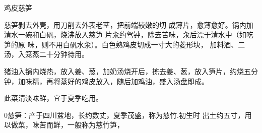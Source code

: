 \begin{recipe}{鸡皮慈笋}

\ingredients



\cooking

慈笋剥去外壳，用刀削去外表老茎，把前端较嫩的切 成薄片，愈薄愈好。锅内加清水一碗和白矾，烧沸放入慈笋 片汆约驾钟，除去苦味，汆后漂于清水中（如吃笋的原 味，则不用白矾水汆）。白色熟鸡皮切成一寸大的菱形块， 加料酒、二汤，入笼蒸二十分钟待用。

\step 猪油入锅内烧热，放入姜、葱，加奶汤烧开后，拣去姜、葱，放入笋片，约烧五分钟，加味精，再将蒸好的鸡皮放入，随后加鸡油，盛入汤盘即成。

\notes

此菜清淡味鲜，宜于夏季吃用。

0慈笋：产于四川盆地，长约数丈，夏季茂盛，称为慈竹.初生时 出土约五寸，用以做菜，味苦而鲜，一般称为慈竹笋，

\end{recipe}

